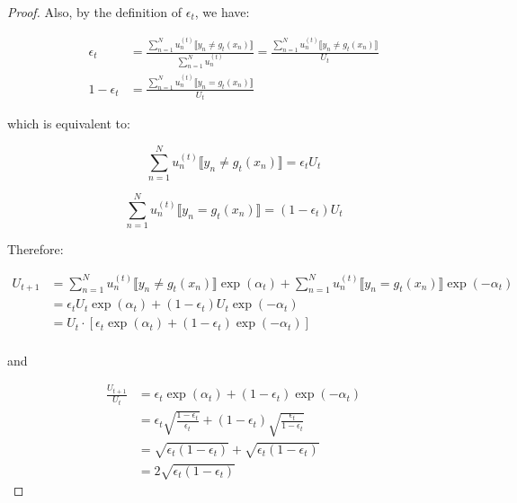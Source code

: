 \documentclass{article}
\begin{document}
\begin{proof}
Also, by the definition of $\epsilon_t$, we have:

\begin{equation*}
\begin{split}
\epsilon_t &= \frac{\sum_{n=1}^N u_n^{(t)} \llbracket y_n \neq g_t(x_n) \rrbracket}{\sum_{n=1}^N u_n^{(t)}} = \frac{\sum_{n=1}^N u_n^{(t)} \llbracket y_n \neq g_t(x_n) \rrbracket}{U_t} \\
1 - \epsilon_t &= \frac{\sum_{n=1}^N u_n^{(t)} \llbracket y_n = g_t(x_n) \rrbracket}{U_t}
\end{split}
\end{equation*}

which is equivalent to:

\begin{equation*}
    \sum_{n=1}^N u_n^{(t)} \llbracket y_n \neq g_t(x_n) \rrbracket = \epsilon_t U_t
\end{equation*}

\begin{equation*}
    \sum_{n=1}^N u_n^{(t)} \llbracket y_n = g_t(x_n) \rrbracket = (1 - \epsilon_t) U_t
\end{equation*}

Therefore:

\begin{equation*}
\begin{split}
    U_{t+1} 
    &= \sum_{n=1}^N u_n^{(t)} \llbracket y_n \neq g_t(x_n) \rrbracket \exp(\alpha_t) + \sum_{n=1}^N u_n^{(t)} \llbracket y_n = g_t(x_n) \rrbracket \exp(-\alpha_t) \\
    &= \epsilon_t U_t \exp(\alpha_t) + (1 - \epsilon_t) U_t \exp(-\alpha_t) \\
    &= U_t \cdot \left[\epsilon_t \exp(\alpha_t) + (1 - \epsilon_t) \exp(-\alpha_t)\right] \\
\end{split}
\end{equation*}

and

\begin{equation*}
\begin{split}
    \frac{U_{t+1}}{U_t} 
    &= \epsilon_t \exp(\alpha_t) + (1 - \epsilon_t) \exp(-\alpha_t) \\
    &= \epsilon_t \sqrt{\frac{1-\epsilon_t}{\epsilon_t}} + (1 - \epsilon_t) \sqrt{\frac{\epsilon_t}{1-\epsilon_t}} \\
    &= \sqrt{\epsilon_t(1-\epsilon_t)} + \sqrt{\epsilon_t(1-\epsilon_t)} \\
    &= 2\sqrt{\epsilon_t(1-\epsilon_t)}
\end{split}
\end{equation*}

\end{proof}
\end{document}

